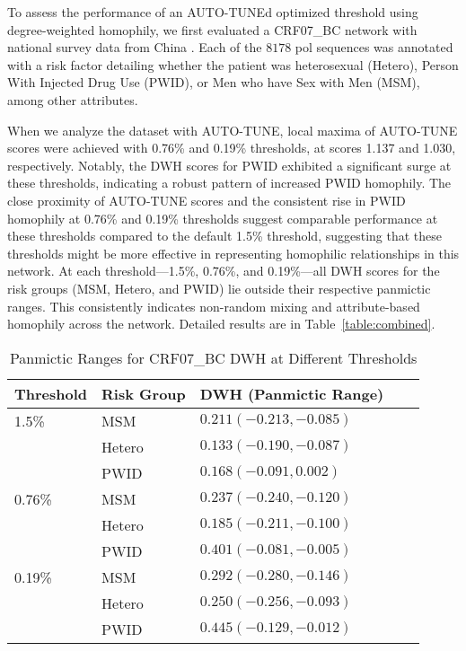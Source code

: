 \documentclass[utf8]{FrontiersinHarvard} %
\begin{document}
To assess the performance of an AUTO-TUNEd optimized threshold using
degree-weighted homophily, we first evaluated a CRF07\_BC network with national survey data
from China \cite{Ge:2021aa} .  Each of the $8178$ 
pol sequences was annotated with a risk factor detailing whether the patient was
heterosexual (Hetero), Person With Injected Drug Use (PWID), or Men who have
Sex with Men (MSM), among other attributes.

When we analyze the dataset with AUTO-TUNE,  local maxima of AUTO-TUNE scores were achieved
with 0.76\% and 0.19\% thresholds, at scores 1.137 and 1.030, respectively.
Notably, the DWH scores for PWID exhibited a significant surge at these
thresholds, indicating a robust pattern of increased PWID homophily. The close
proximity of AUTO-TUNE scores and the consistent rise in PWID homophily at
0.76\% and 0.19\% thresholds suggest comparable performance at these thresholds
compared to the default 1.5\% threshold, suggesting that these thresholds might
be more effective in representing homophilic relationships in this network. At
each threshold—1.5\%, 0.76\%, and 0.19\%—all DWH scores for the risk groups
(MSM, Hetero, and PWID) lie outside their respective panmictic ranges. This
consistently indicates non-random mixing and attribute-based homophily across
the network. Detailed results are in Table~\ref{table:combined}.

\begin{table}[h!]
	\centering
	\begin{tabular}{lllll}
		\hline
		Threshold & Risk Group & DWH   (Panmictic Range) \\
		\hline
		1.5\%     & MSM        & $0.211  (-0.213, -0.085)$        \\
		     & Hetero     & $0.133 (-0.190, -0.087)$       \\
		     & PWID       & $0.168 (-0.091, 0.002)$       \\
		\hline
		0.76\%    & MSM        & $0.237 (-0.240, -0.120)$       \\
		  & Hetero     & $0.185 (-0.211, -0.100)$       \\
		   & PWID       & $0.401 (-0.081, -0.005)$       \\
		\hline
		0.19\%    & MSM        & $0.292 (-0.280, -0.146)$       \\
		    & Hetero     & $0.250 (-0.256, -0.093)$       \\
		    & PWID       & $0.445 (-0.129, -0.012)$       \\
		\hline
	\end{tabular}
	\caption{Panmictic Ranges for CRF07\_BC DWH at Different Thresholds}
	\label{table:panmictic}
\end{table}
\end{document}
